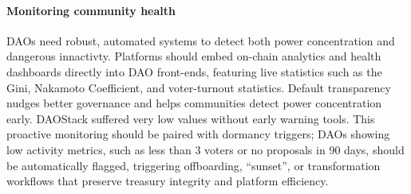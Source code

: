 \documentclass[10pt,lineno]{wlpeerj}
\begin{document}


\paragraph{Monitoring community health}

DAOs need robust, automated systems to detect both power concentration and dangerous innactivty. Platforms should embed on-chain analytics and health dashboards directly into DAO front-ends, featuring live statistics such as the Gini, Nakamoto Coefficient, and voter-turnout statistics. Default transparency nudges better governance and helps communities detect power concentration early. DAOStack suffered very low values without early warning tools. This proactive monitoring should be paired with dormancy triggers; DAOs showing low activity metrics, such as less than 3 voters or no proposals in 90 days, should be automatically flagged, triggering offboarding, ``sunset'', or transformation workflows that preserve treasury integrity and platform efficiency.


\end{document}
